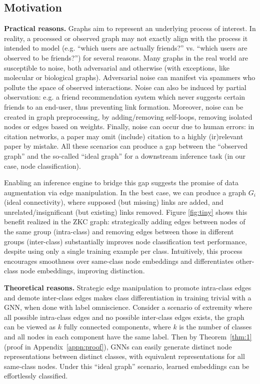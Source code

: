 \documentclass[letterpaper]{article} \usepackage{aaai21}  \usepackage{times}  \usepackage{helvet} \usepackage{courier}  \usepackage[hyphens]{url}  \usepackage{graphicx} \urlstyle{rm} \def\UrlFont{\rm}  \usepackage{natbib}  \usepackage{caption} \frenchspacing  \setlength{\pdfpagewidth}{8.5in}  \setlength{\pdfpageheight}{11in}
\begin{document}
\subsection{Motivation}

\noindent \textbf{Practical reasons.} Graphs aim to represent an underlying process of interest.  In reality, a processed or observed graph may not exactly align with the process it intended to model (e.g. ``which users are actually friends?'' vs. ``which users are observed to be friends?'') for several reasons. Many graphs in the real world are susceptible to noise, both adversarial and otherwise (with exceptions, like molecular or biological graphs).  Adversarial noise can manifest via spammers who pollute the space of observed interactions.  Noise can also be induced by partial observation: e.g. a friend recommendation system which never suggests certain friends to an end-user, thus preventing link formation.  Moreover, noise can be created in graph preprocessing, by adding/removing self-loops, removing isolated nodes or edges based on weights.  Finally, noise can occur due to human errors: in citation networks, a paper may omit (include) citation to a highly (ir)relevant paper by mistake.  All these scenarios can produce a gap between the ``observed graph'' and the so-called ``ideal graph'' for a downstream inference task (in our case, node classification).

Enabling an inference engine to bridge this gap suggests the promise of data augmentation via edge manipulation. In the best case, we can produce a graph $G_i$ (ideal connectivity), where supposed (but missing) links are added, and unrelated/insignificant (but existing) links removed. Figure \ref{fig:tiny} shows this benefit realized in the ZKC graph: strategically adding edges between nodes of the same group (intra-class) and removing edges between those in different groups (inter-class) substantially improves node classification test performance, despite using only a single training example per class.  Intuitively, this process encourages smoothness over same-class node embeddings and differentiates other-class node embeddings, improving distinction.

\noindent \textbf{Theoretical reasons.} \label{sec:edgemanip_theory} Strategic edge manipulation to promote intra-class edges and demote inter-class edges makes class differentiation in training trivial with a GNN, when done with label omniscience.  Consider a scenario of extremity where all possible intra-class edges and no possible inter-class edges exists, the graph can be viewed as $k$ fully connected components, where $k$ is the number of classes and all nodes in each component have the same label. 
Then by Theorem~\ref{thm:1} (proof in Appendix~\ref{appn:proof}), GNNs can easily generate distinct node representations between distinct classes, with equivalent representations for all same-class nodes. Under this ``ideal graph'' scenario, learned embeddings can be effortlessly classified.
\end{document}
